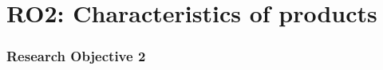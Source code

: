 \documentclass[9pt]{beamer}
\begin{document}
\section{RO2: Characteristics of products}
\begin{frame}
\frametitle{Research Objective 2}
\centering
\textcolor{black}{\LARGE {}}
\end{frame}



\begin{comment}


\begin{frame}
\frametitle{Properties of successful and unsuccessful products}
\begin{itemize}[label=\textcolor{blue}{\textbullet}]
	\item{\textit{Intuitively}: Higher money raised may correlate to success}
	\item{Analyze correlation between Raised money and Amazon rating}
\end{itemize}
	\begin{figure}
	\centering
	\texttt{[image: ./images/1MkickstarterRatingMoneyRaised.pdf]} %
	\caption{\footnotesize Pledged money and rating of Kickstarter products}
\end{figure}
\begin{itemize}[label=\textcolor{blue}{\textbullet}]
	\item{Pearson correlation between them (-0.08)}
	\item{Successful raising funds $\neq$ Producing high quality products}
\end{itemize}
\end{frame}
\end{comment}
\end{document}
